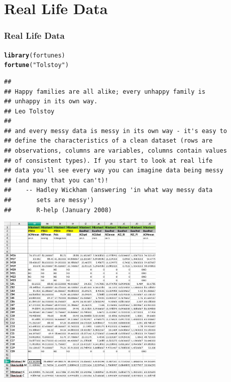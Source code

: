 \documentclass[paper=screen,mathserif]{beamer}\usepackage[]{graphicx}\usepackage[]{color}
\makeatletter
\newcommand{\hlstr}[1]{\textcolor[rgb]{0.192,0.494,0.8}{#1}}%
\newcommand{\hlstd}[1]{\textcolor[rgb]{0.345,0.345,0.345}{#1}}%
\newcommand{\hlkwd}[1]{\textcolor[rgb]{0.737,0.353,0.396}{\textbf{#1}}}%
\newenvironment{kframe}{%
 \def\at@end@of@kframe{}%
 \ifinner\ifhmode%
  \def\at@end@of@kframe{\end{minipage}}%
  \begin{minipage}{\columnwidth}%
 \fi\fi%
 \def\FrameCommand##1{\hskip\@totalleftmargin \hskip-\fboxsep
 \colorbox{shadecolor}{##1}\hskip-\fboxsep
     \hskip-\linewidth \hskip-\@totalleftmargin \hskip\columnwidth}%
 \MakeFramed {\advance\hsize-\width
   \@totalleftmargin\z@ \linewidth\hsize
   \@setminipage}}%
 {\par\unskip\endMakeFramed%
 \at@end@of@kframe}
\newenvironment{knitrout}{}{} %
\newcommand{\ft}[1]{\frametitle{#1}}
\makeatother
\begin{document}
\section{Real Life Data}

\begin{frame}[fragile]
  \ft{Real Life Data}
\begin{knitrout}\scriptsize
{}\color{fgcolor}\begin{kframe}
\begin{alltt}
\hlkwd{library}\hlstd{(fortunes)}
\hlkwd{fortune}\hlstd{(}\hlstr{"Tolstoy"}\hlstd{)}
\end{alltt}
\begin{verbatim}
## 
## Happy families are all alike; every unhappy family is
## unhappy in its own way.
## Leo Tolstoy
## 
## and every messy data is messy in its own way - it's easy to
## define the characteristics of a clean dataset (rows are
## observations, columns are variables, columns contain values
## of consistent types). If you start to look at real life
## data you'll see every way you can imagine data being messy
## (and many that you can't)!
##    -- Hadley Wickham (answering 'in what way messy data
##       sets are messy')
##       R-help (January 2008)
\end{verbatim}
\end{kframe}
\end{knitrout}
\end{frame}

\begin{frame}
  \begin{center}
    \includegraphics[width=8cm]{graphics/real_life_data2.jpeg}
  \end{center}
\end{frame}
\end{document}
